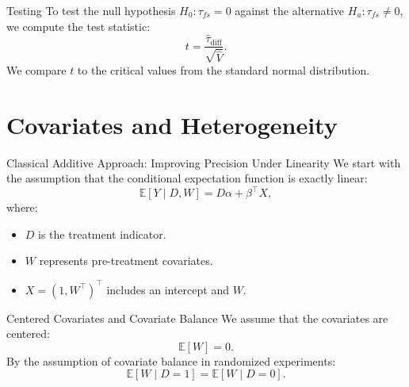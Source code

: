 \documentclass[xcolor=svgnames,t]{beamer}
\begin{document}
    \begin{frame}{Testing}
    To test the null hypothesis $H_0: \tau_{fs} = 0$ against the alternative $H_a: \tau_{fs} \ne 0$, we compute the test statistic:
    \[
    t = \frac{\hat{\tau}_{\text{diff}}}{\sqrt{\hat{V}}}.
    \]
    We compare $t$ to the critical values from the standard normal distribution.
    
    \vspace{2cm} %
    
    \end{frame}






\section{Covariates and Heterogeneity}

\begin{frame}{Classical Additive Approach: Improving Precision Under Linearity}
    We start with the assumption that the conditional expectation function is exactly linear:
    \[
    \mathbb{E}[Y \mid D, W] = D\alpha + \beta^\top X,
    \]
    where:
    \begin{itemize}
        \item $D$ is the treatment indicator.
        \item $W$ represents pre-treatment covariates.
        \item $X = (1, W^\top)^\top$ includes an intercept and $W$.
    \end{itemize}
    
    \vspace{1cm} %
    
    \end{frame}
    
    \begin{frame}{Centered Covariates and Covariate Balance}
    We assume that the covariates are centered:
    \[
    \mathbb{E}[W] = 0.
    \]
    By the assumption of covariate balance in randomized experiments:
    \[
    \mathbb{E}[W \mid D = 1] = \mathbb{E}[W \mid D = 0].
    \]
    
    \vspace{1cm} %
    
    \end{frame}
    
\end{document}
